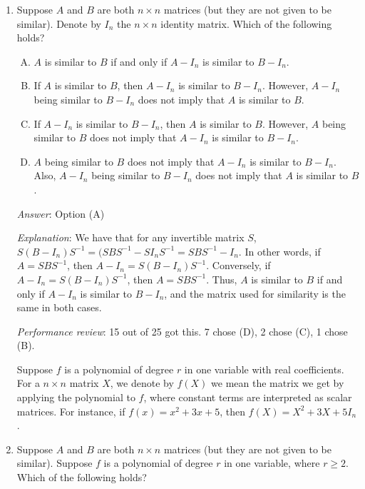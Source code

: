 \documentclass[10pt]{amsart}
\begin{document}
\begin{enumerate}

\item Suppose $A$ and $B$ are both $n \times n$ matrices (but they are
  not given to be similar). Denote by $I_n$ the $n \times n$ identity
  matrix. Which of the following holds?

  \begin{enumerate}[(A)]
  \item $A$ is similar to $B$ if and only if $A - I_n$ is similar to
    $B - I_n$.
  \item If $A$ is similar to $B$, then $A - I_n$ is similar to $B -
    I_n$. However, $A - I_n$ being similar to $B - I_n$ does not imply
    that $A$ is similar to $B$.
  \item If $A - I_n$ is similar to $B - I_n$, then $A$ is similar to
    $B$. However, $A$ being similar to $B$ does not imply that $A -
    I_n$ is similar to $B - I_n$.
  \item $A$ being similar to $B$ does not imply that $A - I_n$ is
    similar to $B - I_n$. Also, $A - I_n$ being similar to $B - I_n$
    does not imply that $A$ is similar to $B$.
  \end{enumerate}

  {\em Answer}: Option (A)

  {\em Explanation}: We have that for any invertible matrix $S$, $S(B
  - I_n)S^{-1} = (SBS^{-1} - SI_nS^{-1} = SBS^{-1} - I_n$. In other
  words, if $A = SBS^{-1}$, then $A - I_n = S(B -
  I_n)S^{-1}$. Conversely, if $A - I_n = S(B - I_n)S^{-1}$, then $A =
  SBS^{-1}$. Thus, $A$ is similar to $B$ if and only if $A - I_n$ is
  similar to $B - I_n$, and the matrix used for similarity is the same in
  both cases.

  {\em Performance review}: 15 out of 25 got this. 7 chose (D), 2
  chose (C), 1 chose (B).

  \vspace{0.6in}

  Suppose $f$ is a polynomial of degree $r$ in one variable with real
  coefficients. For a $n \times n$ matrix $X$, we denote by $f(X)$ we
  mean the matrix we get by applying the polynomial to $f$, where
  constant terms are interpreted as scalar matrices. For instance, if
  $f(x) = x^2 + 3x + 5$, then $f(X) = X^2 + 3X + 5I_n$.

\item Suppose $A$ and $B$ are both $n \times n$ matrices (but they are
  not given to be similar). Suppose $f$ is a polynomial of degree $r$
  in one variable, where $r \ge 2$. Which of the following holds?


\end{enumerate}
\end{document}
